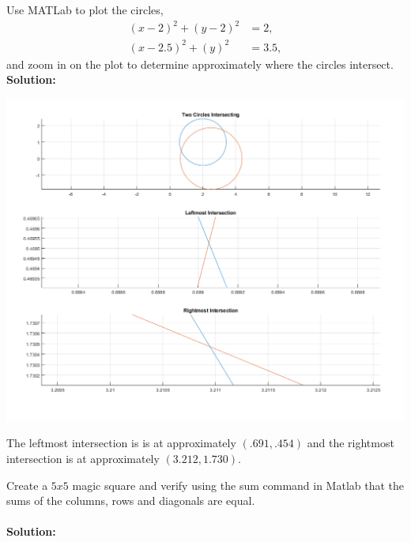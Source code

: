 \documentclass[12pt]{article}
\makeatletter
\theoremstyle{homework}
\newenvironment{exercise}[1]
{\def\@currentlabel{#1}\exercisecore}
{\endexercisecore}
\makeatother
\begin{document}
\begin{exercise}{7} Use MATLab to plot the circles,
  \begin{align*}
    (x - 2)^2 + (y - 2)^2 &= 2,\\
    (x - 2.5)^2 + (y)^2 &= 3.5,
    \end{align*}
  and zoom in on the plot to determine approximately where the circles intersect.
\textbf{Solution:}


\begin{center}
  \includegraphics[width=\textwidth]{circle.png}
\end{center}
The leftmost intersection is is at approximately $(.691,.454)$ and the rightmost intersection is at approximately $(3.212, 1.730)$.
\end{exercise}
\vspace{1in}



\begin{exercise}{9} Create a $5 x 5$ magic square and verify using the sum command in Matlab that the sums of the columns, rows and diagonals are equal.\\\\
\textbf{Solution:} 

\end{exercise}
\vspace{1in}
\end{document}
